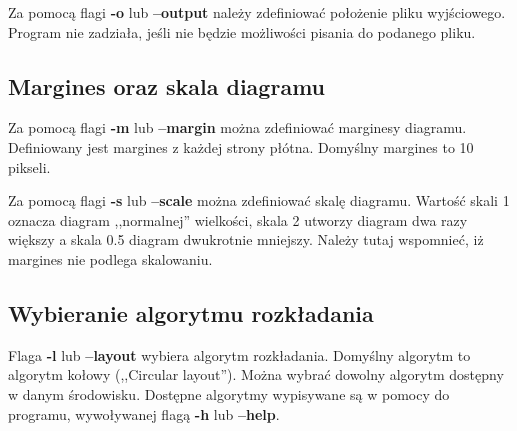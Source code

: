 Za pomocą flagi \textbf{-o} lub \textbf{--output} należy zdefiniować położenie pliku wyjściowego. Program nie zadziała, jeśli nie będzie możliwości pisania do podanego pliku.

\subsection{Margines oraz skala diagramu}
Za pomocą flagi \textbf{-m} lub \textbf{--margin} można zdefiniować marginesy diagramu. Definiowany jest margines z każdej strony płótna. Domyślny margines to 10 pikseli.

Za pomocą flagi \textbf{-s} lub \textbf{--scale} można zdefiniować skalę diagramu. Wartość skali 1 oznacza diagram ,,normalnej'' wielkości, skala 2 utworzy diagram dwa razy większy a skala 0.5 diagram dwukrotnie mniejszy. Należy tutaj wspomnieć, iż margines nie podlega skalowaniu.

\subsection{Wybieranie algorytmu rozkładania}
Flaga \textbf{-l} lub \textbf{--layout} wybiera algorytm rozkładania. Domyślny algorytm to algorytm kołowy (,,Circular layout''). Można wybrać dowolny algorytm dostępny w danym środowisku. Dostępne algorytmy wypisywane są w pomocy do programu, wywoływanej flagą \textbf{-h} lub \textbf{--help}.
